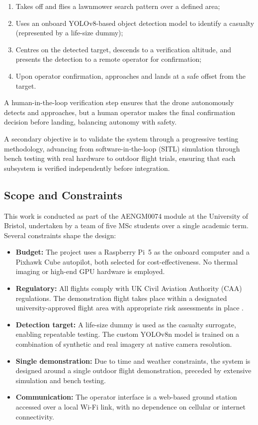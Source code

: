 \begin{enumerate}
    \item Takes off and flies a lawnmower search pattern over a defined area;
    \item Uses an onboard YOLOv8-based object detection model to identify a casualty (represented by a life-size dummy);
    \item Centres on the detected target, descends to a verification altitude, and presents the detection to a remote operator for confirmation;
    \item Upon operator confirmation, approaches and lands at a safe offset from the target.
\end{enumerate}

A human-in-the-loop verification step ensures that the drone autonomously detects and approaches, but a human operator makes the final confirmation decision before landing, balancing autonomy with safety.

A secondary objective is to validate the system through a progressive testing methodology, advancing from software-in-the-loop (SITL) simulation through bench testing with real hardware to outdoor flight trials, ensuring that each subsystem is verified independently before integration.

\subsection{Scope and Constraints}\label{sec:scope}

This work is conducted as part of the AENGM0074 module at the University of Bristol, undertaken by a team of five MSc students over a single academic term. Several constraints shape the design:

\begin{itemize}
    \item \textbf{Budget:} The project uses a Raspberry Pi~5 as the onboard computer and a Pixhawk Cube autopilot, both selected for cost-effectiveness. No thermal imaging or high-end GPU hardware is employed.
    \item \textbf{Regulatory:} All flights comply with UK Civil Aviation Authority (CAA) regulations. The demonstration flight takes place within a designated university-approved flight area with appropriate risk assessments in place \cite{ukcaa}.
    \item \textbf{Detection target:} A life-size dummy is used as the casualty surrogate, enabling repeatable testing. The custom YOLOv8n model is trained on a combination of synthetic and real imagery at native camera resolution.
    \item \textbf{Single demonstration:} Due to time and weather constraints, the system is designed around a single outdoor flight demonstration, preceded by extensive simulation and bench testing.
    \item \textbf{Communication:} The operator interface is a web-based ground station accessed over a local Wi-Fi link, with no dependence on cellular or internet connectivity.
\end{itemize}

